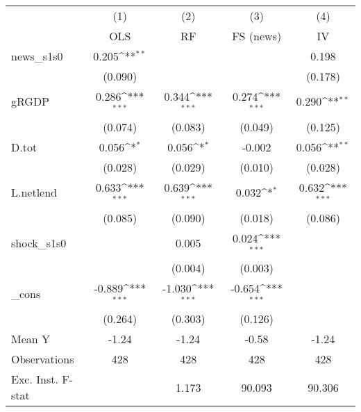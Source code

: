 {
\def\sym#1{\ifmmode^{#1}\else\(^{#1}\)\fi}
\begin{tabular}{l*{4}{c}}
\toprule
            &\multicolumn{1}{c}{(1)}&\multicolumn{1}{c}{(2)}&\multicolumn{1}{c}{(3)}&\multicolumn{1}{c}{(4)}\\
            &\multicolumn{1}{c}{OLS}&\multicolumn{1}{c}{RF}&\multicolumn{1}{c}{FS (news)}&\multicolumn{1}{c}{IV}\\
\midrule
news\_s1s0   &       0.205\sym{**} &                     &                     &       0.198         \\
            &     (0.090)         &                     &                     &     (0.178)         \\
\addlinespace
gRGDP       &       0.286\sym{***}&       0.344\sym{***}&       0.274\sym{***}&       0.290\sym{**} \\
            &     (0.074)         &     (0.083)         &     (0.049)         &     (0.125)         \\
\addlinespace
D.tot       &       0.056\sym{*}  &       0.056\sym{*}  &      -0.002         &       0.056\sym{**} \\
            &     (0.028)         &     (0.029)         &     (0.010)         &     (0.028)         \\
\addlinespace
L.netlend   &       0.633\sym{***}&       0.639\sym{***}&       0.032\sym{*}  &       0.632\sym{***}\\
            &     (0.085)         &     (0.090)         &     (0.018)         &     (0.086)         \\
\addlinespace
shock\_s1s0  &                     &       0.005         &       0.024\sym{***}&                     \\
            &                     &     (0.004)         &     (0.003)         &                     \\
\addlinespace
\_cons      &      -0.889\sym{***}&      -1.030\sym{***}&      -0.654\sym{***}&                     \\
            &     (0.264)         &     (0.303)         &     (0.126)         &                     \\
\midrule
Mean Y      &       -1.24         &       -1.24         &       -0.58         &       -1.24         \\
Observations&         428         &         428         &         428         &         428         \\
Exc. Inst. F-stat&                     &       1.173         &      90.093         &      90.306         \\
\bottomrule
\end{tabular}
}
